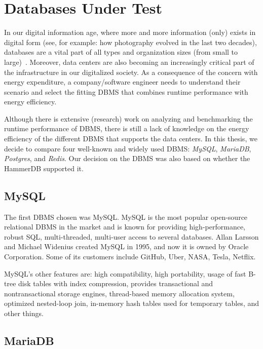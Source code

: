 \section{Databases Under Test}
\label{sc:dbtest}


In our digital information age, where more and more information (only) exists in digital form (see, for example: how photography evolved in the last two decades), databases are a vital part of all types and organization sizes (from small to large)~\cite{10.14778/2732240.2732246}. Moreover, data centers are also becoming an increasingly critical part of the infrastructure in our digitalized society. As a consequence of the concern with energy expenditure, a company/software engineer needs to understand their scenario and select the fitting DBMS that combines runtime performance with energy efficiency.

Although there is extensive (research) work on analyzing and benchmarking the runtime performance of DBMS\cite{10.14778/1920841.1920902,seybold2019mowgli,stonebraker2010mapreduce,10.1145/2452376.2452448}, there is still a lack of knowledge on the energy efficiency of the different DBMS that supports the data centers. In this thesis, we decide to compare four well-known and widely used DBMS: \textit{MySQL}, \textit{MariaDB}, \textit{Postgres}, and \textit{Redis}. Our decision on the DBMS was also based on whether the HammerDB supported it.

\subsection{MySQL}

The first DBMS chosen was MySQL. MySQL is the most popular open-source relational DBMS in the market and is known for providing high-performance, robust SQL, multi-threaded, multi-user access to several databases. Allan Larsson and Michael Widenius created MySQL in 1995, and now it is owned by Oracle Corporation. Some of its customers include GitHub, Uber, NASA, Tesla, Netflix. 

MySQL's other features are: high compatibility, high portability, usage of fast B-tree disk tables with index compression, provides transactional and nontransactional storage engines, thread-based memory allocation system, optimized nested-loop join, in-memory hash tables used for temporary tables, and other things.

\subsection{MariaDB}

